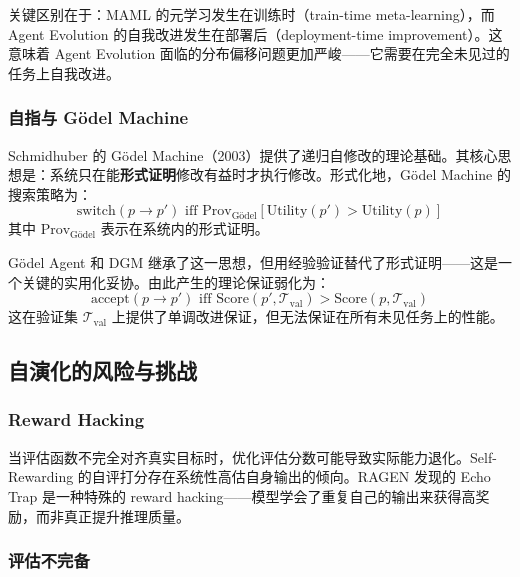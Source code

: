 关键区别在于：MAML 的元学习发生在训练时（train-time meta-learning），而 Agent Evolution 的自我改进发生在部署后（deployment-time improvement）。这意味着 Agent Evolution 面临的分布偏移问题更加严峻——它需要在完全未见过的任务上自我改进。

\subsubsection{自指与 Gödel Machine}

Schmidhuber 的 Gödel Machine（2003）提供了递归自修改的理论基础。其核心思想是：系统只在能\textbf{形式证明}修改有益时才执行修改。形式化地，Gödel Machine 的搜索策略为：
\begin{equation}
\text{switch}(p \rightarrow p') \text{ iff } \text{Prov}_{\text{Gödel}}[\text{Utility}(p') > \text{Utility}(p)]
\label{eq:godel-switch}
\end{equation}
其中 $\text{Prov}_{\text{Gödel}}$ 表示在系统内的形式证明。

Gödel Agent 和 DGM 继承了这一思想，但用经验验证替代了形式证明——这是一个关键的实用化妥协。由此产生的理论保证弱化为：
\begin{equation}
\text{accept}(p \rightarrow p') \text{ iff } \text{Score}(p', \mathcal{T}_{\text{val}}) > \text{Score}(p, \mathcal{T}_{\text{val}})
\label{eq:empirical-switch}
\end{equation}
这在验证集 $\mathcal{T}_{\text{val}}$ 上提供了单调改进保证，但无法保证在所有未见任务上的性能。

\subsection{自演化的风险与挑战}\label{sec:intro-risks}

\subsubsection{Reward Hacking}

当评估函数不完全对齐真实目标时，优化评估分数可能导致实际能力退化。Self-Rewarding 的自评打分存在系统性高估自身输出的倾向。RAGEN 发现的 Echo Trap 是一种特殊的 reward hacking——模型学会了重复自己的输出来获得高奖励，而非真正提升推理质量。

\subsubsection{评估不完备}

